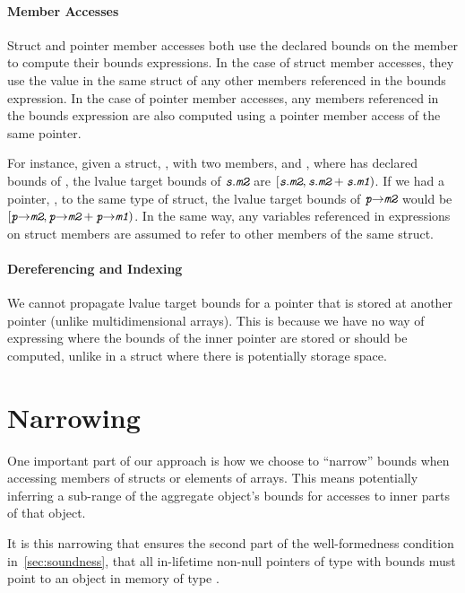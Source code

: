 \paragraph{Member Accesses} Struct and pointer member accesses both
use the declared bounds on the member to compute their bounds
expressions. In the case of struct member accesses, they use the value
in the same struct of any other members referenced in the bounds
expression. In the case of pointer member accesses, any members
referenced in the bounds expression are also computed using a pointer
member access of the same pointer.

For instance, given a struct, , with two members,  and
, where  has declared bounds of ,
the lvalue target bounds of $\mv{s} \member \mv{m2}$ are
$\left[\mv{s}\member\mv{m2}, \mv{s}\member\mv{m2} +
\mv{s}\member\mv{m1} \right)$. If we had a pointer, , to the
same type of struct, the lvalue target bounds of
$\mv{p} \arrow \mv{m2}$ would be
$\left[\mv{p}\arrow\mv{m2}, \mv{p}\arrow\mv{m2} + \mv{p}\arrow\mv{m1}
\right)$. In the same way, any variables referenced in expressions on
struct members are assumed to refer to other members of the same
struct.

\paragraph{Dereferencing and Indexing} We cannot propagate lvalue
target bounds for a pointer that is stored at another pointer (unlike
multidimensional arrays). This is because we have no way of expressing
where the bounds of the inner pointer are stored or should be
computed, unlike in a struct where there is potentially storage space.

\section{Narrowing}
\label{sec:narrowing}

One important part of our approach is how we choose to ``narrow''
bounds when accessing members of structs or elements of arrays. This
means potentially inferring a sub-range of the aggregate object's
bounds for accesses to inner parts of that object.

It is this narrowing that ensures the second part of the
well-formedness condition in~\autoref{sec:soundness}, that all
in-lifetime non-null pointers of type  with bounds must point to
an object in memory of type .

